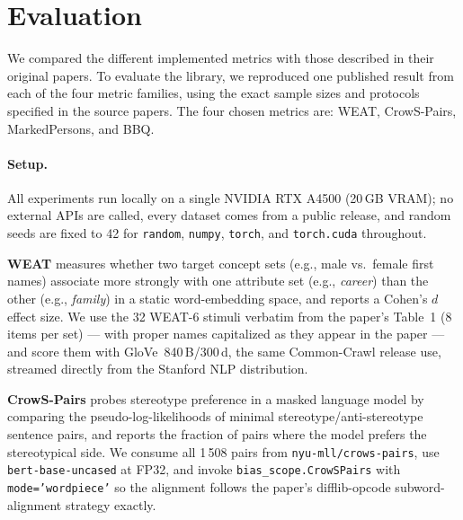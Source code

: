 
\section{Evaluation}
We compared the different implemented metrics with those described in
their original papers. To evaluate the library, we reproduced one
published result from each of the four metric families, using the
exact sample sizes and protocols specified in the source papers. The
four chosen metrics are: WEAT, CrowS-Pairs, MarkedPersons, and BBQ.

\paragraph{Setup.}
All experiments run locally on a single NVIDIA RTX A4500 (20\,GB
VRAM); no external APIs are called, every dataset comes from a
public release, and random seeds are fixed to 42 for
\texttt{random}, \texttt{numpy}, \texttt{torch}, and
\texttt{torch.cuda} throughout.

\textbf{WEAT} \citep{caliskan2017semantics} measures whether two
target concept sets (e.g., male vs.\ female first names) associate
more strongly with one attribute set (e.g., \emph{career}) than the
other (e.g., \emph{family}) in a static word-embedding space, and
reports a Cohen's $d$ effect size. We use the 32 WEAT-6 stimuli
verbatim from the paper's Table~1 (8 items per set) --- with proper
names capitalized as they appear in the paper --- and score them
with GloVe~840\,B/300\,d, the same Common-Crawl release
\citet{caliskan2017semantics} use, streamed directly from the
Stanford NLP distribution.

\textbf{CrowS-Pairs} \citep{nangia2020crows} probes stereotype
preference in a masked language model by comparing the
pseudo-log-likelihoods of minimal stereotype/anti-stereotype
sentence pairs, and reports the fraction of pairs where the model
prefers the stereotypical side. We consume all 1\,508 pairs from
\texttt{nyu-mll/crows-pairs}, use \texttt{bert-base-uncased} at
FP32, and invoke \texttt{bias\_scope.CrowSPairs} with
\texttt{mode='wordpiece'} so the alignment follows the paper's
difflib-opcode subword-alignment strategy exactly.

